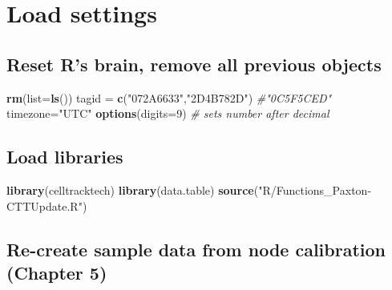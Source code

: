 \documentclass[
]{book}
\newenvironment{Shaded}{\begin{snugshade}}{\end{snugshade}}
\newcommand{\AttributeTok}[1]{\textcolor[rgb]{0.13,0.29,0.53}{#1}}
\newcommand{\CommentTok}[1]{\textcolor[rgb]{0.56,0.35,0.01}{\textit{#1}}}
\newcommand{\DecValTok}[1]{\textcolor[rgb]{0.00,0.00,0.81}{#1}}
\newcommand{\FunctionTok}[1]{\textcolor[rgb]{0.13,0.29,0.53}{\textbf{#1}}}
\newcommand{\NormalTok}[1]{#1}
\newcommand{\OtherTok}[1]{\textcolor[rgb]{0.56,0.35,0.01}{#1}}
\newcommand{\StringTok}[1]{\textcolor[rgb]{0.31,0.60,0.02}{#1}}
\begin{document}
\section{Load settings}\label{load-settings-4}

\subsection{Reset R's brain, remove all previous objects}\label{reset-rs-brain-remove-all-previous-objects}

\begin{Shaded}
\begin{Highlighting}[]
\FunctionTok{rm}\NormalTok{(}\AttributeTok{list=}\FunctionTok{ls}\NormalTok{())}
\NormalTok{tagid }\OtherTok{=} \FunctionTok{c}\NormalTok{(}\StringTok{"072A6633"}\NormalTok{,}\StringTok{"2D4B782D"}\NormalTok{) }\CommentTok{\#"0C5F5CED"}
\NormalTok{timezone}\OtherTok{=}\StringTok{"UTC"}
\FunctionTok{options}\NormalTok{(}\AttributeTok{digits=}\DecValTok{9}\NormalTok{) }\CommentTok{\# sets number after decimal}
\end{Highlighting}
\end{Shaded}

\subsection{Load libraries}\label{load-libraries-1}

\begin{Shaded}
\begin{Highlighting}[]
\FunctionTok{library}\NormalTok{(celltracktech)}
\FunctionTok{library}\NormalTok{(data.table)}
\FunctionTok{source}\NormalTok{(}\StringTok{"R/Functions\_Paxton{-}CTTUpdate.R"}\NormalTok{)}
\end{Highlighting}
\end{Shaded}

\subsection{Re-create sample data from node calibration (Chapter 5)}\label{re-create-sample-data-from-node-calibration-chapter-5}
\end{document}
